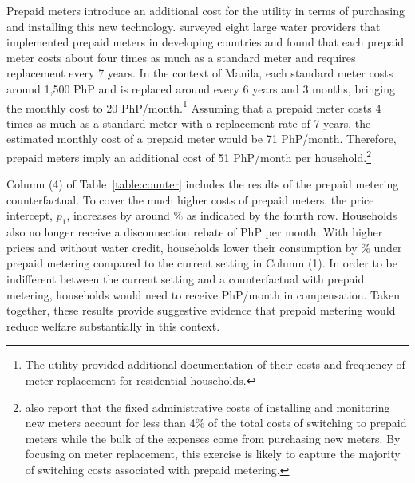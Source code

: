 \documentclass[12pt]{article}
\begin{document}

Prepaid meters introduce an additional cost for the utility in terms of purchasing and installing this new technology.  \cite{heymans2014limits} surveyed eight large water providers that implemented prepaid meters in developing countries and found that each prepaid meter costs about four times as much as a standard meter and requires replacement every 7 years.  In the context of Manila, each standard meter costs around 1,500 PhP and is replaced around every 6 years and 3 months, bringing the monthly cost to 20 PhP/month.\footnote{The utility provided additional documentation of their costs and frequency of meter replacement for residential households.}  Assuming that a prepaid meter costs 4 times as much as a standard meter with a replacement rate of 7 years, the estimated monthly cost of a prepaid meter would be 71 PhP/month.  Therefore, prepaid meters imply an additional cost of 51 PhP/month per household.\footnote{\cite{heymans2014limits} also report that the fixed administrative costs of installing and monitoring new meters account for less than 4\% of the total costs of switching to prepaid meters while the bulk of the expenses come from purchasing new meters.  By focusing on meter replacement, this exercise is likely to capture the majority of switching costs associated with prepaid metering.}  

Column (4) of Table~\ref{table:counter} includes the results of the prepaid metering counterfactual.  To cover the much higher costs of prepaid meters, the price intercept, $p_1$, increases by around \unskip\% as indicated by the fourth row.  Households also no longer receive a disconnection rebate of PhP per month.  With higher prices and without water credit, households lower their consumption by \unskip\% under prepaid metering compared to the current setting in Column (1).  In order to be indifferent between the current setting and a counterfactual with prepaid metering, households would need to receive PhP/month in compensation.  Taken together, these results provide suggestive evidence that prepaid metering would reduce welfare substantially in this context.
\end{document}
